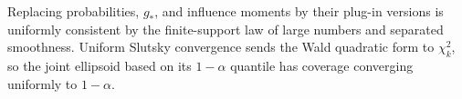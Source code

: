 Replacing probabilities, \(g_*\), and influence moments by their plug-in versions is uniformly consistent by the finite-support law of large numbers and separated smoothness.  Uniform Slutsky convergence sends the Wald quadratic form to \(\chi_k^2\), so the joint ellipsoid based on its \(1-\alpha\) quantile has coverage converging uniformly to \(1-\alpha\).
